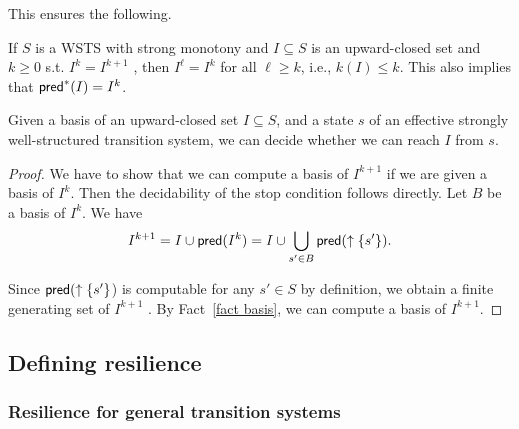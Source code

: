 This ensures the following.

\begin{fact}\label{stop condition}
If $S$ is a WSTS with strong monotony and $I \subseteq S$ is an upward-closed set and $k \geq 0$ s.t. $I^k = I^{k+1}$ , then $I^\ell = I^k$ for all $\ell \geq k$, i.e.,
$k(I) \leq k$. This also implies that $\textsf{pred}^*(I) = I^k$.
\end{fact}



\begin{lemma}
 Given a basis of an upward-closed set $I \subseteq S$, and a state $s$ of an effective strongly well-structured transition
system, we can decide whether we can reach $I$ from $s$.
\end{lemma}

\begin{proof}
We have to show that we can compute a basis of $I^{k+1}$ if we are given a basis of $I^k $. 
Then the
decidability of the stop condition follows directly. Let $B$ be a basis of $I^k$. 
We have
$$I^{k+1} = I \cup \textsf{pred}(I^k ) = I \cup
\bigcup_{s' \in B}
\textsf{pred}(\uparrow \{s' \}).$$

Since $\textsf{pred}(\uparrow \{s' \}$) is computable for any $s'\in S$ by definition, we obtain a finite generating set of $I^{k+1}$ . By
Fact~\ref{fact basis}, we can compute a basis of $I^{k+1}$.
\end{proof}

\iffalse
\subsection{Defining resilience}


\subsubsection{Resilience for general transition systems}

